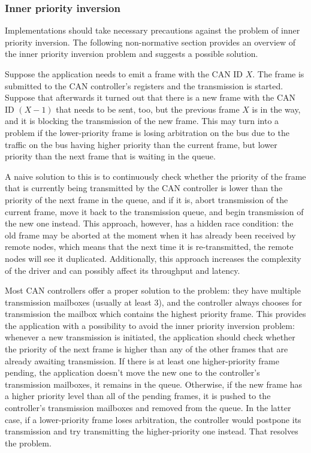 \subsubsection{Inner priority inversion}

Implementations should take necessary precautions against the problem of inner priority inversion.
The following non-normative section provides an overview of the inner priority inversion problem and
suggests a possible solution.

\begin{remark}[breakable]
    Suppose the application needs to emit a frame with the CAN ID $X$.
    The frame is submitted to the CAN controller's registers and the transmission is started.
    Suppose that afterwards it turned out that there is a new frame with the CAN ID $(X-1)$ that needs to be sent,
    too, but the previous frame $X$ is in the way, and it is blocking the transmission of the new frame.
    This may turn into a problem if the lower-priority frame is losing arbitration on the bus due
    to the traffic on the bus having higher priority than the current frame,
    but lower priority than the next frame that is waiting in the queue.

    A naive solution to this is to continuously check whether the priority of the frame that is currently being
    transmitted by the CAN controller is lower than the priority of the next frame in the queue, and if it is,
    abort transmission of the current frame, move it back to the transmission queue,
    and begin transmission of the new one instead.
    This approach, however, has a hidden race condition:
    the old frame may be aborted at the moment when it has already been received by remote nodes,
    which means that the next time it is re-transmitted, the remote nodes will see it duplicated.
    Additionally, this approach increases the complexity of the driver and can possibly affect
    its throughput and latency.

    Most CAN controllers offer a proper solution to the problem:
    they have multiple transmission mailboxes (usually at least 3),
    and the controller always chooses for transmission the mailbox which contains the highest priority frame.
    This provides the application with a possibility to avoid the inner priority inversion problem:
    whenever a new transmission is initiated, the application should check whether the priority of the next frame
    is higher than any of the other frames that are already awaiting transmission.
    If there is at least one higher-priority frame pending,
    the application doesn't move the new one to the controller's transmission mailboxes,
    it remains in the queue.
    Otherwise, if the new frame has a higher priority level than all of the pending frames,
    it is pushed to the controller's transmission mailboxes and removed from the queue.
    In the latter case, if a lower-priority frame loses arbitration,
    the controller would postpone its transmission and try transmitting the higher-priority one instead.
    That resolves the problem.


\end{remark}
